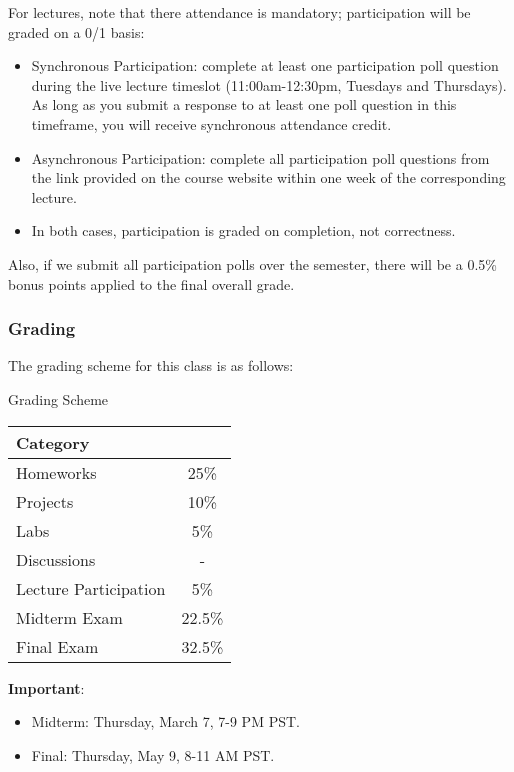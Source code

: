 \documentclass[openany]{book}
\begin{document}
For lectures, note that there attendance is mandatory; participation will be graded on a 0/1 basis:
\begin{itemize}
	\item Synchronous Participation: complete at least one participation poll question during the live lecture timeslot (11:00am-12:30pm, Tuesdays and Thursdays). As long as you submit a response to at least one poll question in this timeframe, you will receive synchronous attendance credit.
	\item Asynchronous Participation: complete all participation poll questions from the link provided on the course website within one week of the corresponding lecture.
	\item In both cases, participation is graded on completion, not correctness.
\end{itemize}

Also, if we submit all participation polls over the semester, there will be a 0.5\% bonus points applied to the final overall grade.

\subsubsection{Grading}
The grading scheme for this class is as follows:
\begin{miscbox}{Grading Scheme}
	\begin{center}
		\begin{tabularx}{6cm}{X|c}
			\textbf{Category} & \\
			\hline
			Homeworks & 25\% \\
			\hline
			Projects & 10\% \\
			\hline
			Labs & 5\% \\
			\hline
			Discussions & -\\
			\hline
			Lecture Participation & 5\% \\
			\hline
			Midterm Exam & 22.5\% \\
			\hline
			Final Exam & 32.5\% \\
		\end{tabularx}
	\end{center}
\end{miscbox}

\begin{warn}
	\textbf{Important}:
	\begin{itemize}
		\item Midterm: Thursday, March 7, 7-9 PM PST.
		\item Final: Thursday, May 9, 8-11 AM PST.
	\end{itemize}
\end{warn}
\end{document}
